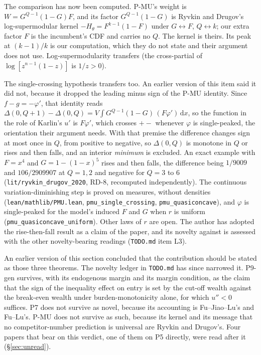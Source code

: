 \documentclass[11pt,a4paper]{article}
\begin{document}
\begin{enumerate}
  The comparison has now been computed. P-MU's weight is
  $W = G^{Q-1}(1-G)F$, and its factor $G^{Q-1}(1-G)$ is Ryvkin and Drugov's
  log-supermodular kernel $-H_\theta = F^{k-1}(1-F)$ under
  $G \leftrightarrow F$, $Q \leftrightarrow k$; our extra factor $F$ is the
  incumbent's CDF and carries no $Q$. The kernel is theirs. Its peak at
  $(k-1)/k$ is our computation, which they do not state and their argument
  does not use. Log-supermodularity transfers (the cross-partial of
  $\log[z^{n-1}(1-z)]$ is $1/z > 0$).

  The single-crossing hypothesis transfers too. An earlier version of this
  item said it did not, because it dropped the leading minus sign of the P-MU
  identity. Since $f - g = -\varphi'$, that identity reads
  $\Delta(0,Q{+}1) - \Delta(0,Q) = V\!\int G^{Q-1}(1-G)\,(F\varphi')\,\mathrm{d}x$,
  so the function in the role of Karlin's $u'$ is $F\varphi'$, which crosses
  $+-$ whenever $\varphi$ is single-peaked, the orientation their argument
  needs. With that premise the difference changes sign at most once in $Q$,
  from positive to negative, so $\Delta(0,Q)$ is monotone in $Q$ or rises and
  then falls, and an interior \emph{minimum} is excluded. An exact example
  with $F = x^4$ and $G = 1-(1-x)^5$ rises and then falls, the difference
  being $1/9009$ and $106/2909907$ at $Q = 1, 2$ and negative for $Q = 3$ to $6$
  (\texttt{lit/ryvkin\_drugov\_2020}, RD-8, recomputed independently). The
  continuous variation-diminishing step is proved on measures, without
  densities (\texttt{lean/mathlib/PMU.lean}, \texttt{pmu\_single\_crossing},
  \texttt{pmu\_quasiconcave}), and $\varphi$ is single-peaked for the model's
  induced $F$ and $G$ when $r$ is uniform (\texttt{pmu\_quasiconcave\_uniform}).
  Other laws of $r$ are open. The author has adopted the rise-then-fall result
  as a claim of the paper, and its novelty against \citet{RyvkinDrugov2020} is
  assessed with the other novelty-bearing readings (\texttt{TODO.md} item L3).
\end{enumerate}

An earlier version of this section concluded that the contribution should be
stated as those three theorems. The novelty ledger in \texttt{TODO.md} has since
narrowed it. P9-gen survives, with its endogenous margin and its margin
condition, as the claim that the sign of the inequality effect on entry is set
by the cut-off wealth against the break-even wealth under burden-monotonicity
alone, for which $u'' < 0$ suffices.
P7 does not survive as novel, because its accounting is Fu--Jiao--Lu's and
Fu--Lu's. P-MU does not survive as such, because its kernel and its message
that no competitor-number prediction is universal are Ryvkin and Drugov's. Four
papers that bear on this verdict, one of them on P5 directly, were read after
it (\S\ref{sec:unread}).
\end{document}
